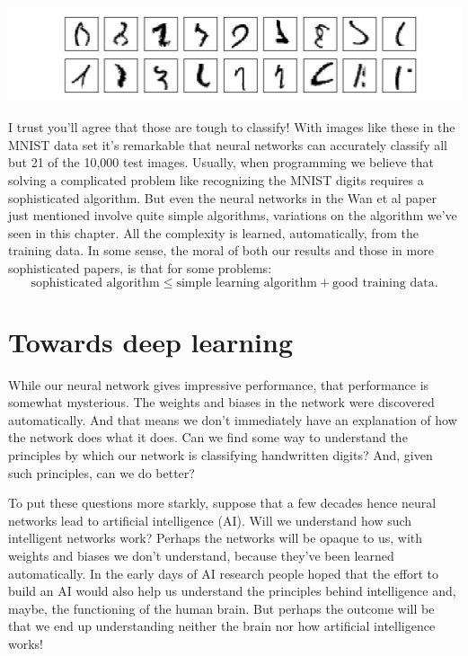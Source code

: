 \documentclass[a4paper,12pt]{report}%
\begin{document}
\begin{center}
 \includegraphics[width=0.9\linewidth]{images/mnist_really_bad_images.png}
\end{center}

I trust you'll agree that those are tough to classify! With images like these in the MNIST data set it's remarkable that neural networks can accurately classify all but 21 of the 10,000 test images. Usually, when programming we believe that solving a complicated problem like recognizing the MNIST digits requires a sophisticated algorithm. But even the neural networks in the Wan et al paper just mentioned involve quite simple algorithms, variations on the algorithm we've seen in this chapter. All the complexity is learned, automatically, from the training data. In some sense, the moral of both our results and those in more sophisticated papers, is that for some problems:
\begin{equation*}
\mbox{sophisticated algorithm} \leq  \mbox{simple learning algorithm} + \mbox{good training data}.
\end{equation*}

\section{Towards deep learning}
While our neural network gives impressive performance, that performance is somewhat mysterious. The weights and biases in the network were discovered automatically. And that means we don't immediately have an explanation of how the network does what it does. Can we find some way to understand the principles by which our network is classifying handwritten digits? And, given such principles, can we do better?

To put these questions more starkly, suppose that a few decades hence neural networks lead to artificial intelligence (AI). Will we understand how such intelligent networks work? Perhaps the networks will be opaque to us, with weights and biases we don't understand, because they've been learned automatically. In the early days of AI research people hoped that the effort to build an AI would also help us understand the principles behind intelligence and, maybe, the functioning of the human brain. But perhaps the outcome will be that we end up understanding neither the brain nor how artificial intelligence works!
\end{document}
